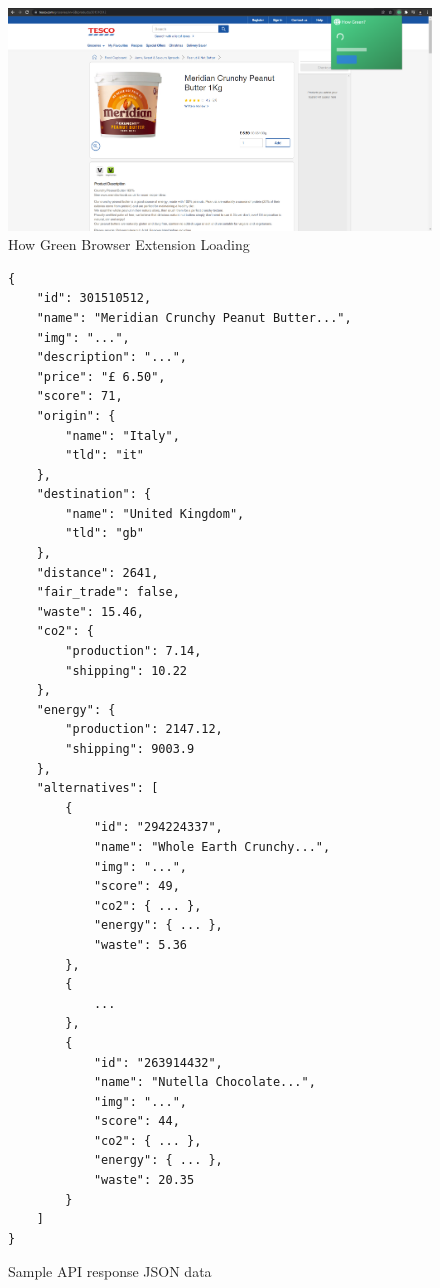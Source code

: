 \documentclass[a4,10pt,twocolumn]{article}
\begin{document}
\begin{figure}[h]
    \centering
    \includegraphics[width=0.9\columnwidth]{assets/final/extension_loading.png}
    \caption{How Green Browser Extension Loading}
\end{figure}


\begin{figure}[h]
\centering
\begin{verbatim}
{
    "id": 301510512,
    "name": "Meridian Crunchy Peanut Butter...",
    "img": "...",
    "description": "...",
    "price": "£ 6.50",
    "score": 71,
    "origin": {
        "name": "Italy",
        "tld": "it"
    },
    "destination": {
        "name": "United Kingdom",
        "tld": "gb"
    },
    "distance": 2641,
    "fair_trade": false,
    "waste": 15.46,
    "co2": {
        "production": 7.14,
        "shipping": 10.22
    },
    "energy": {
        "production": 2147.12,
        "shipping": 9003.9
    },
    "alternatives": [
        {
            "id": "294224337",
            "name": "Whole Earth Crunchy...",
            "img": "...",
            "score": 49,
            "co2": { ... },
            "energy": { ... },
            "waste": 5.36
        },
        {
            ...
        },
        {
            "id": "263914432",
            "name": "Nutella Chocolate...",
            "img": "...",
            "score": 44,
            "co2": { ... },
            "energy": { ... },
            "waste": 20.35
        }
    ]
}
\end{verbatim}
\caption{Sample API response JSON data}
\end{figure}

\begin{center}
\end{center}
\end{document}
